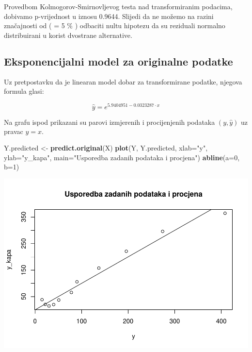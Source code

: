 \documentclass[]{article}
\newenvironment{Shaded}{\begin{snugshade}}{\end{snugshade}}
\newcommand{\KeywordTok}[1]{\textcolor[rgb]{0.13,0.29,0.53}{\textbf{{#1}}}}
\newcommand{\DataTypeTok}[1]{\textcolor[rgb]{0.13,0.29,0.53}{{#1}}}
\newcommand{\DecValTok}[1]{\textcolor[rgb]{0.00,0.00,0.81}{{#1}}}
\newcommand{\StringTok}[1]{\textcolor[rgb]{0.31,0.60,0.02}{{#1}}}
\newcommand{\NormalTok}[1]{{#1}}
\begin{document}
Provedbom Kolmogorov-Smirnovljevog testa nad transformiranim podacima,
dobivamo p-vrijednost u iznosu 0.9644. Slijedi da ne možemo na razini
značajnosti od ( \alpha = 5 \% ) odbaciti nultu hipotezu da su reziduali
normalno distribuirani u korist dvostrane alternative.

\subsection{Eksponencijalni model za originalne
podatke}\label{eksponencijalni-model-za-originalne-podatke}

Uz pretpostavku da je linearan model dobar za transformirane podatke,
njegova formula glasi:

\[\hat{y} = e^{5.9404951 - 0.0323287 \cdot x} \]

Na grafu ispod prikazani su parovi izmjerenih i procijenjenih podataka
\((y, \hat{y})\) uz pravac \(y=x\).

\begin{Shaded}
\begin{Highlighting}[]
\NormalTok{Y.predicted <-}\StringTok{ }\KeywordTok{predict.original}\NormalTok{(X)}
\KeywordTok{plot}\NormalTok{(Y, Y.predicted, }\DataTypeTok{xlab=}\StringTok{"y"}\NormalTok{, }\DataTypeTok{ylab=}\StringTok{"y_kapa"}\NormalTok{, }\DataTypeTok{main=}\StringTok{"Usporedba zadanih podataka i procjena"}\NormalTok{)}
\KeywordTok{abline}\NormalTok{(}\DataTypeTok{a=}\DecValTok{0}\NormalTok{, }\DataTypeTok{b=}\DecValTok{1}\NormalTok{)}
\end{Highlighting}
\end{Shaded}

\includegraphics{Izvjestaj_files/figure-latex/unnamed-chunk-14-1.pdf}
\end{document}
